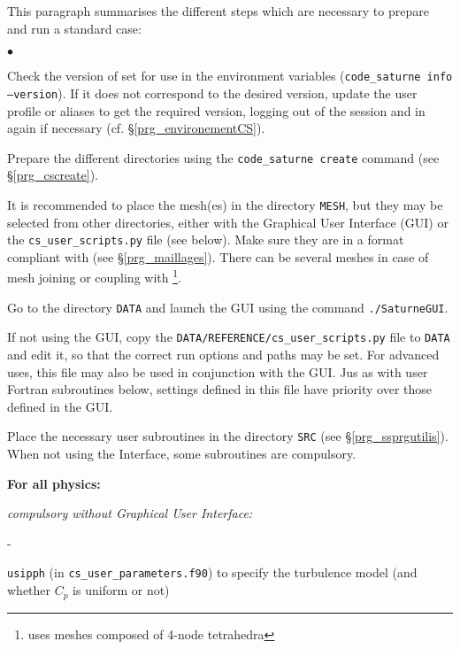 {{{This paragraph summarises the different steps which are necessary to
prepare and run a standard case:

\begin{list}{$\bullet$}{}

\item Check the version of \CS set for use in the environment variables
(\texttt{code\_saturne~info --version}). If it does not correspond to
the desired version, update the user profile or aliases to get the
required version, logging out of the session and in again if necessary (cf.
\S\ref{prg_environementCS}).

\item Prepare the different directories using the \texttt{code\_saturne~create}
command (see \S\ref{prg_cscreate}).

\item It is recommended to place the mesh(es) in the directory \texttt{MESH},
but they may be selected from other directories, either with the Graphical User Interface (GUI)
 or the \texttt{cs\_user\_scripts.py} file (see below). Make sure they are
in a format compliant with \CS (see \S\ref{prg_maillages}). There can be
several meshes in case of mesh joining or coupling with
\syrthes\footnote{ uses meshes composed of 4-node tetrahedra}.

\item Go to the directory \texttt{DATA} and launch the
      GUI using the command \texttt{./SaturneGUI}.

\item If not using the GUI, copy the
  \texttt{DATA/REFERENCE/cs\_user\_scripts.py} file to \texttt{DATA} and
  edit it, so that the correct run options and paths may be set. For advanced
  uses, this file may also be used in conjunction with the GUI. Jus as with
  user Fortran subroutines below, settings defined in this file have priority
  over those defined in the GUI.

\item Place the necessary user subroutines in the directory \texttt{SRC} (see
\S\ref{prg_ssprgutilis}). When not using the Interface, some subroutines are
compulsory.

\begin{list}{}{}

\item {\bf For all physics:}

    \begin{list}{}{}
        \item {\em compulsory without Graphical User Interface:}
        \begin{list}{-}{}
            \item \texttt{usipph} (in \texttt{cs\_user\_parameters.f90}) to
              specify the turbulence model (and whether $C_p$ is uniform or not)


\end{list}
\end{list}
\end{list}
\end{list}}}}
